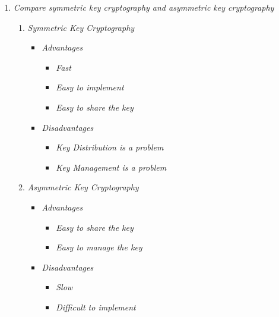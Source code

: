 \documentclass[11pt]{article}
\begin{document}
\begin{enumerate}
	\item \textit{Compare symmetric key cryptography and asymmetric key cryptography}\\
	
	      \begin{enumerate}
		      \item \textit{Symmetric Key Cryptography}
		            \begin{itemize}
			            \item \textit{Advantages}
			                  \begin{itemize}
				                  \item \textit{Fast}
				                  \item \textit{Easy to implement}
				                  \item \textit{Easy to share the key}
			                  \end{itemize}
			            \item \textit{Disadvantages}
			                  \begin{itemize}
				                  \item \textit{Key Distribution is a problem}
				                  \item \textit{Key Management is a problem}
			                  \end{itemize}
		            \end{itemize}
		      \item \textit{Asymmetric Key Cryptography}
		            \begin{itemize}
			            \item \textit{Advantages}
			                  \begin{itemize}
				                  \item \textit{Easy to share the key}
				                  \item \textit{Easy to manage the key}
			                  \end{itemize}
			            \item \textit{Disadvantages}
			                  \begin{itemize}
				                  \item \textit{Slow}
				                  \item \textit{Difficult to implement}
			                  \end{itemize}
		            \end{itemize}
	      \end{enumerate}


\end{enumerate}
\end{document}
